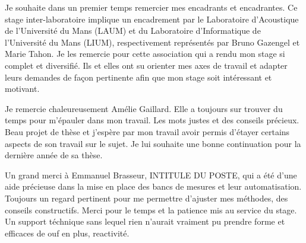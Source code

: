 
Je souhaite dans un premier temps remercier mes encadrants et encadrantes. Ce stage inter-laboratoire implique un encadrement par le Laboratoire d'Acoustique de l'Université du Mans (LAUM) et du Laboratoire d'Informatique de l'Université du Mans (LIUM), respectivement représentés par Bruno Gazengel et Marie Tahon. Je les remercie pour cette association qui a rendu mon stage si complet et diversifié. Ils et elles ont su orienter mes axes de travail et adapter leurs demandes de façon pertinente afin que mon stage soit intéressant et motivant.

Je remercie chaleureusement Amélie Gaillard. Elle a toujours sur trouver du temps pour m'épauler dans mon travail. Les mots justes et des conseils précieux. Beau projet de thèse et j'espère par mon travail avoir permis d'étayer certains aspects de son travail sur le sujet. Je lui souhaite une bonne continuation pour la dernière année de sa thèse.

Un grand merci à Emmanuel Brasseur, INTITULE DU POSTE, qui a été d'une aide précieuse dans la mise en place des bancs de mesures et leur automatisation. Toujours un regard pertinent pour me permettre d'ajuster mes méthodes, des conseils constructifs. Merci pour le temps et la patience mis au service du stage. Un support téchnique sans lequel rien n'aurait vraiment pu prendre forme et efficaces de ouf en plus, reactivité.
